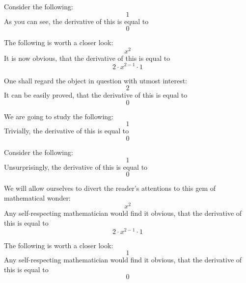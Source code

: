 \documentclass{article}
\begin{document}
Consider the following:
\begin{equation}
1 
\end{equation}
As you can see, the derivative of this is equal to
\begin{equation}
0 
\end{equation}

The following is worth a closer look:
\begin{equation}
x ^{2 } 
\end{equation}
It is now obvious, that the derivative of this is equal to
\begin{equation}
2 \cdot x ^{2 - 1 } \cdot 1 
\end{equation}

One shall regard the object in question with utmost interest:
\begin{equation}
2 
\end{equation}
It can be easily proved, that the derivative of this is equal to
\begin{equation}
0 
\end{equation}

We are going to study the following:
\begin{equation}
1 
\end{equation}
Trivially, the derivative of this is equal to
\begin{equation}
0 
\end{equation}

Consider the following:
\begin{equation}
1 
\end{equation}
Unsurprisingly, the derivative of this is equal to
\begin{equation}
0 
\end{equation}

We will allow ourselves to divert the reader's attentions to this gem of mathematical wonder:
\begin{equation}
x ^{2 } 
\end{equation}
Any self-respecting mathematician would find it obvious, that the derivative of this is equal to
\begin{equation}
2 \cdot x ^{2 - 1 } \cdot 1 
\end{equation}

The following is worth a closer look:
\begin{equation}
1 
\end{equation}
Any self-respecting mathematician would find it obvious, that the derivative of this is equal to
\begin{equation}
0 
\end{equation}
\end{document}

